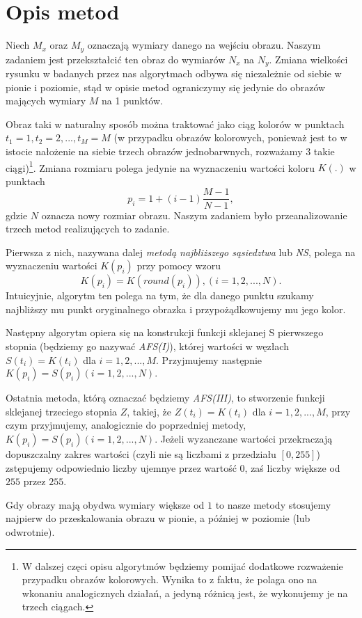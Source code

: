 \section{Opis metod}
Niech $M_x$ oraz $M_y$ oznaczają wymiary danego na wejściu obrazu. Naszym
zadaniem jest przekształcić ten obraz do wymiarów $N_x$ na $N_y$. Zmiana
wielkości rysunku w badanych przez nas algorytmach odbywa się niezależnie od
siebie w pionie i poziomie, stąd w opisie metod ograniczymy się jedynie do
obrazów mających wymiary $M$ na 1 punktów.

Obraz taki w naturalny sposób można traktować jako ciąg kolorów w punktach
$t_1=1,t_2=2,...,t_M=M$ (w przypadku obrazów kolorowych, ponieważ jest to w
istocie nałożenie na siebie trzech obrazów jednobarwnych, rozważamy 3 takie
ciągi)\footnote{W dalszej częci opisu algorytmów będziemy pomijać dodatkowe
rozważenie przypadku obrazów kolorowych. Wynika to z faktu, że polaga ono na
wkonaniu analogicznych działań, a jedyną różnicą jest, że wykonujemy je na
trzech ciągach.}. Zmiana rozmiaru polega jedynie na wyznaczeniu wartości koloru
$K(.)$ w punktach
$$p_i=1+(i-1)\frac{M-1}{N-1},$$
gdzie $N$ oznacza nowy rozmiar obrazu. Naszym zadaniem było przeanalizowanie
trzech metod realizujących to zadanie.

Pierwsza z nich, nazywana dalej \textit{metodą najbliższego sąsiedztwa} lub \textit{NS}, polega
na wyznaczeniu wartości $K(p_i)$ przy pomocy wzoru
$$K(p_i)=K(round(p_i)), (i=1,2,...,N).$$
Intuicyjnie, algorytm ten polega na tym, że dla danego punktu szukamy najbliższy
mu punkt oryginalnego obrazka i przypożądkowujemy mu jego kolor.

Następny algorytm opiera się na konstrukcji funkcji sklejanej S pierwszego
stopnia (będziemy go nazywać \textit{AFS(I)}), której wartości w węzłach $S(t_i)
=K(t_i)$ dla $i=1,2,...,M$. Przyjmujemy następnie $K(p_i)=S(p_i) (i=1,2,...,N).$

Ostatnia metoda, którą oznaczać będziemy \textit{AFS(III)}, to stworzenie
funkcji sklejanej trzeciego stopnia $Z$, takiej, że $Z(t_i)=K(t_i)$ dla
$i=1,2,...,M$, przy czym przyjmujemy, analogicznie do poprzedniej metody,
$K(p_i)=S(p_i) (i=1,2,...,N)$. Jeżeli wyzanczane wartości przekraczają
dopuszczalny zakres wartości (czyli nie są liczbami z przedziału $[0,255]$)
zstępujemy odpowiednio liczby ujemnye przez wartość $0$, zaś liczby większe od
$255$ przez $255$.

Gdy obrazy mają obydwa wymiary większe od $1$ to nasze metody stosujemy najpierw
do przeskalowania obrazu w pionie, a później w poziomie (lub odwrotnie).

